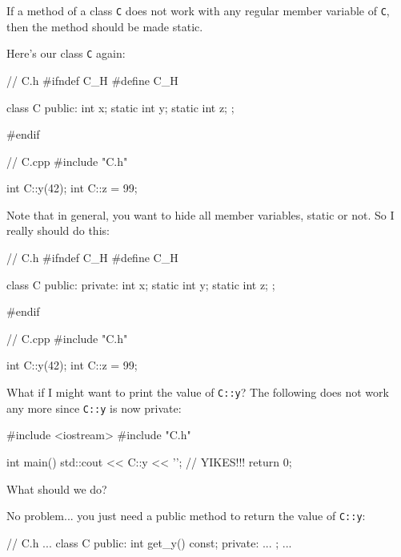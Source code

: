 If a method of a class \texttt{C} does not work with any regular member
variable of \texttt{C}, then the method should be made static.


Here's our class \texttt{C} again:

\begin{consolethree}[escapeinside=||]
// C.h
#ifndef C_H
#define C_H

class C
{
public:
    int x;
    static int y;
    static int z;
};

#endif
\end{consolethree}

\begin{consolethree}[escapeinside=||]
// C.cpp
#include "C.h"

int C::y(42);
int C::z = 99;
\end{consolethree}

Note that in general, you want to hide all member variables, static or
not. So I really should do this:

\begin{consolethree}[escapeinside=||]
// C.h
#ifndef C_H
#define C_H

class C
{
public:
private:
    int x;
    static int y;
    static int z;
};

#endif
\end{consolethree}

\begin{consolethree}[escapeinside=||]
// C.cpp
#include "C.h"

int C::y(42);
int C::z = 99;
\end{consolethree}

What if I might want to print the value of \texttt{C::y}? The following
does not work any more since \texttt{C::y} is now private:

\begin{consolethree}[escapeinside=||]
#include <iostream>
#include "C.h"

int main()
{
    std::cout << C::y << '\n'; // YIKES!!!
    return 0;
}
\end{consolethree}

What should we do?

No problem... you just need a public method to return the value of
\texttt{C::y}:

\begin{consolethree}[escapeinside=||]
// C.h
...
class C
{
public:
    int get_y() const;
private:
    ...
};
...
\end{consolethree}


